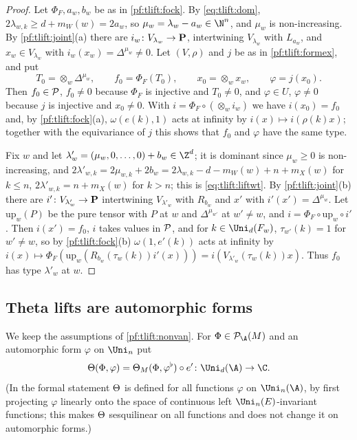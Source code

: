 \begin{proof}
Let $\Phi_F,a_w,b_w$ be as in \cref{pf:tlift:fock}. By \eqref{eq:tlift:dom}, $2\lambda_{w,k}\ge d+m_W(w)=2a_w$, so
$\mu_w=\lambda_w-a_w\in\N^n$, and $\mu_w$ is non-increasing. By \cref{pf:tlift:joint}(a) there are $i_w\colon V_{\lambda_w}\to\mathbf{P}$,
intertwining $V_{\lambda_w}$ with $L_{a_w}$, and $x_w\in V_{\lambda_w}$ with $i_w(x_w)=\Delta^{\mu_w}\ne0$. Let
$(V,\rho)$ and $j$ be as in \cref{pf:tlift:formex}, and put
\[
  T_0=\otimes_w\Delta^{\mu_w},\qquad f_0=\Phi_F(T_0),\qquad x_0=\otimes_wx_w,\qquad\varphi=j(x_0).
\]
Then $f_0\in\mathcal{P}$, $f_0\ne0$ because $\Phi_F$ is injective and $T_0\ne0$, and $\varphi\in U$, $\varphi\ne0$ because $j$ is injective and
$x_0\ne0$. With $i=\Phi_F\circ(\otimes_wi_w)$ we have $i(x_0)=f_0$ and, by \cref{pf:tlift:fock}(a), $\omega(e(k),1)$ acts at
infinity by $i(x)\mapsto i(\rho(k)x)$; together with the equivariance of $j$ this shows that $f_0$ and $\varphi$ have the
same type.

Fix $w$ and let $\lambda'_w=(\mu_w,0,\dots,0)+b_w\in\Z^d$; it is dominant since $\mu_w\ge0$ is non-increasing, and
$2\lambda'_{w,k}=2\mu_{w,k}+2b_w=2\lambda_{w,k}-d-m_W(w)+n+m_X(w)$ for $k\le n$, $2\lambda'_{w,k}=n+m_X(w)$ for $k>n$; this is
\eqref{eq:tlift:liftwt}. By \cref{pf:tlift:joint}(b) there are $i'\colon V_{\lambda'_w}\to\mathbf{P}$ intertwining $V_{\lambda'_w}$ with
$R_{b_w}$ and $x'$ with $i'(x')=\Delta^{\mu_w}$. Let $\mathrm{up}_w(P)$ be the pure tensor with $P$ at $w$ and $\Delta^{\mu_{w'}}$
at $w'\ne w$, and $i=\Phi_F\circ\mathrm{up}_w\circ i'$. Then $i(x')=f_0$, $i$ takes values in $\mathcal{P}$, and for $k\in\Uni_d(F_w)$,
$\tau_{w'}(k)=1$ for $w'\ne w$, so by \cref{pf:tlift:fock}(b) $\omega(1,e'(k))$ acts at infinity by
$i(x)\mapsto\Phi_F(\mathrm{up}_w(R_{b_w}(\tau_w(k))i'(x)))=i(V_{\lambda'_w}(\tau_w(k))x)$. Thus $f_0$ has type $\lambda'_w$ at $w$.
\end{proof}


\subsection{Theta lifts are automorphic forms}\label{pf:tlift:autsec}

We keep the assumptions of \cref{pf:tlift:nonvan}. For $\Phi\in\tliftPD(M)$ and an automorphic form $\varphi$ on $\Uni_n$
put
\begin{equation}\label{eq:tlift:Theta}
  \tliftlift(\Phi,\varphi)=\tliftlift_M(\Phi,\varphi^\flat)\circ e'\colon\Uni_d(\A)\to\C.
\end{equation}
(In the formal statement $\Theta$ is defined for all functions $\varphi$ on $\Uni_n(\A)$, by first projecting
$\varphi$ linearly onto the space of continuous left $\Uni_n(E)$-invariant functions; this makes $\Theta$
sesquilinear on all functions and does not change it on automorphic forms.)

